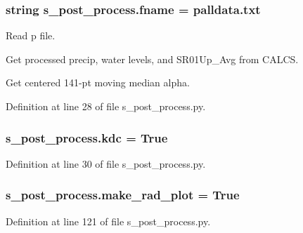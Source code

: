 \hypertarget{namespaces__post__process_a21843322f9c0bc1447e3fcf8b98c75f1}{}
\subsubsection[{fname}]{\setlength{\rightskip}{0pt plus 5cm}string s\+\_\+post\+\_\+process.\+fname = \textquotesingle{}palldata.\+txt\textquotesingle{}}\label{namespaces__post__process_a21843322f9c0bc1447e3fcf8b98c75f1}


Read p file. 

Get processed precip, water levels, and S\+R01\+Up\+\_\+\+Avg from C\+A\+L\+C\+S.

Get centered 141-\/pt moving median alpha.

Definition at line 28 of file s\+\_\+post\+\_\+process.\+py.

\hypertarget{namespaces__post__process_a516eea1289ef3a804cf67e0365d78623}{}
\subsubsection[{kdc}]{\setlength{\rightskip}{0pt plus 5cm}s\+\_\+post\+\_\+process.\+kdc = True}\label{namespaces__post__process_a516eea1289ef3a804cf67e0365d78623}


Definition at line 30 of file s\+\_\+post\+\_\+process.\+py.

\hypertarget{namespaces__post__process_aa86c5a7587bc6a969a974c1fea5c1435}{}
\subsubsection[{make\+\_\+rad\+\_\+plot}]{\setlength{\rightskip}{0pt plus 5cm}s\+\_\+post\+\_\+process.\+make\+\_\+rad\+\_\+plot = True}\label{namespaces__post__process_aa86c5a7587bc6a969a974c1fea5c1435}


Definition at line 121 of file s\+\_\+post\+\_\+process.\+py.

\hypertarget{namespaces__post__process_af1070685db63f676b11421534fe570e9}{}
